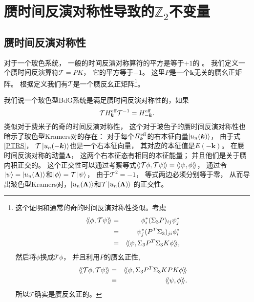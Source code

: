 \section{赝时间反演对称性导致的$\mathbb Z_2$不变量}\label{sec2}

\subsection{赝时间反演对称性}

对于一个玻色系统，
一般的时间反演对称算符的平方是等于$+1$的 \cite{Sakurai2014}。
我们定义一个赝时间反演算符$\mathcal{T}=PK$，
它的平方等于$-1$。
这里$P$是一个$\boldsymbol k$无关的赝幺正矩阵。
根据定义我们有$\mathcal T$是一个赝反幺正矩阵\footnote{
这个证明和通常的奇的时间反演对称性类似。考虑
\begin{eqnarray*}
	\langle\!\langle \phi,\mathcal{T}\psi \rangle\!\rangle &=& \phi^*_i (\Sigma_3P)_{ij} \psi^*_j\\
	&=& \psi_j^* (P^T\Sigma_3)_{ji}\phi^*_i\\
	&=& \langle\!\langle \psi,\Sigma_3 P^T\Sigma_3 K\phi \rangle\!\rangle,
\end{eqnarray*}
然后将$\phi$换成$\mathcal{T}\phi$，
并且利用$P$的赝幺正性,
\begin{eqnarray*}
	\langle\!\langle \mathcal{T}\phi,\mathcal{T}\psi \rangle\!\rangle &=& \langle\!\langle \psi,\Sigma_3 P^T \Sigma_3 KPK\phi \rangle\!\rangle\\
	& = &\langle\!\langle \psi,\phi \rangle\!\rangle.
\end{eqnarray*}
所以$\mathcal T$确实是赝反幺正的。}。

我们说一个玻色型BdG系统是满足赝时间反演对称性的，如果
\begin{equation}
	\mathcal{T} H^{\text{eff}}_{\boldsymbol k} \mathcal{T}^{-1}=H_{-\boldsymbol k}^{\text{eff}}.\label{PTRS}
\end{equation}
类似对于费米子的奇的时间反演对称性，
这个对于玻色子的赝时间反演对称性也暗示了玻色型Kramers对的存在：
对于每个$H^{\text{eff}}_{\boldsymbol k}$的右本征向量$\ket{u_n(\boldsymbol k)}$，
由于式\eqref{PTRS}，
$\mathcal{T}\ket{u_n(-\boldsymbol k)}$也是一个右本征向量，
其对应的本征值是$E(-\boldsymbol k)$。
在赝时间反演对称的动量$\boldsymbol{\Lambda}$，
这两个右本征态有相同的本征能量；
并且他们是关于赝内积正交的\cite{Kondo2019}。
这个正交性可以通过考察等式$\langle\!\langle \mathcal{T}\phi,\mathcal{T}\psi \rangle\!\rangle=\langle\!\langle \psi,\phi \rangle\!\rangle$，
通过令$\ket{\psi}=\ket{u_n(\boldsymbol{\Lambda})}$和$\ket{\phi}=\mathcal{T} \ket{\psi}$，
由于$\mathcal{T}^{2}=-1$，
等式两边必须分别等于零，
从而导出玻色型Kramers对，$\ket{u_n(\boldsymbol{\Lambda})}$和$\mathcal{T} \ket{u_n(\boldsymbol{\Lambda})}$ 的正交性。

